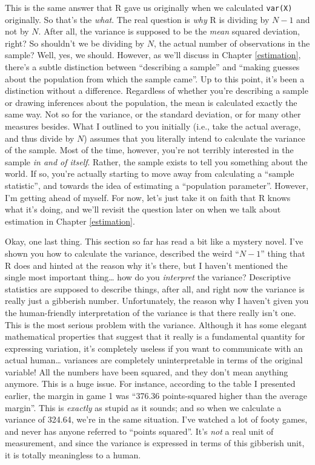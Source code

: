 \documentclass[
]{book}
\begin{document}
This is the same answer that R gave us originally when we calculated \texttt{var(X)} originally. So that's the \emph{what}. The real question is \emph{why} R is dividing by \(N-1\) and not by \(N\). After all, the variance is supposed to be the \emph{mean} squared deviation, right? So shouldn't we be dividing by \(N\), the actual number of observations in the sample? Well, yes, we should. However, as we'll discuss in Chapter \ref{estimation}, there's a subtle distinction between ``describing a sample'' and ``making guesses about the population from which the sample came''. Up to this point, it's been a distinction without a difference. Regardless of whether you're describing a sample or drawing inferences about the population, the mean is calculated exactly the same way. Not so for the variance, or the standard deviation, or for many other measures besides. What I outlined to you initially (i.e., take the actual average, and thus divide by \(N\)) assumes that you literally intend to calculate the variance of the sample. Most of the time, however, you're not terribly interested in the sample \emph{in and of itself}. Rather, the sample exists to tell you something about the world. If so, you're actually starting to move away from calculating a ``sample statistic'', and towards the idea of estimating a ``population parameter''. However, I'm getting ahead of myself. For now, let's just take it on faith that R knows what it's doing, and we'll revisit the question later on when we talk about estimation in Chapter \ref{estimation}.

Okay, one last thing. This section so far has read a bit like a mystery novel. I've shown you how to calculate the variance, described the weird ``\(N-1\)'' thing that R does and hinted at the reason why it's there, but I haven't mentioned the single most important thing\ldots{} how do you \emph{interpret} the variance? Descriptive statistics are supposed to describe things, after all, and right now the variance is really just a gibberish number. Unfortunately, the reason why I haven't given you the human-friendly interpretation of the variance is that there really isn't one. This is the most serious problem with the variance. Although it has some elegant mathematical properties that suggest that it really is a fundamental quantity for expressing variation, it's completely useless if you want to communicate with an actual human\ldots{} variances are completely uninterpretable in terms of the original variable! All the numbers have been squared, and they don't mean anything anymore. This is a huge issue. For instance, according to the table I presented earlier, the margin in game 1 was ``376.36 points-squared higher than the average margin''. This is \emph{exactly} as stupid as it sounds; and so when we calculate a variance of 324.64, we're in the same situation. I've watched a lot of footy games, and never has anyone referred to ``points squared''. It's \emph{not} a real unit of measurement, and since the variance is expressed in terms of this gibberish unit, it is totally meaningless to a human.
\end{document}
